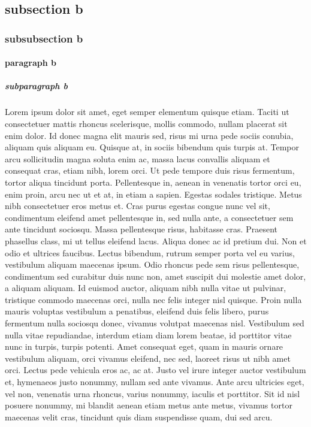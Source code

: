 \documentclass[12pt,a4paper,german]{article}
\begin{document}
\subsection{subsection b }
\subsubsection{subsubsection b}
\paragraph{paragraph b}
\subparagraph{subparagraph b}

Lorem ipsum dolor sit amet, eget semper elementum quisque etiam. Taciti ut consectetuer mattis rhoncus scelerisque, mollis commodo, nullam placerat sit enim dolor. Id donec magna elit mauris sed, risus mi urna pede sociis conubia, aliquam quis aliquam eu. Quisque at, in sociis bibendum quis turpis at. Tempor arcu sollicitudin magna soluta enim ac, massa lacus convallis aliquam et consequat cras, etiam nibh, lorem orci. Ut pede tempore duis risus fermentum, tortor aliqua tincidunt porta. Pellentesque in, aenean in venenatis tortor orci eu, enim proin, arcu nec ut et at, in etiam a sapien.
Egestas sodales tristique. Metus nibh consectetuer eros metus et. Cras purus egestas congue nunc vel sit, condimentum eleifend amet pellentesque in, sed nulla ante, a consectetuer sem ante tincidunt sociosqu. Massa pellentesque risus, habitasse cras. Praesent phasellus class, mi ut tellus eleifend lacus. Aliqua donec ac id pretium dui.
Non et odio et ultrices faucibus. Lectus bibendum, rutrum semper porta vel eu varius, vestibulum aliquam maecenas ipsum. Odio rhoncus pede sem risus pellentesque, condimentum sed curabitur duis nunc non, amet suscipit dui molestie amet dolor, a aliquam aliquam. Id euismod auctor, aliquam nibh nulla vitae ut pulvinar, tristique commodo maecenas orci, nulla nec felis integer nisl quisque. Proin nulla mauris voluptas vestibulum a penatibus, eleifend duis felis libero, purus fermentum nulla sociosqu donec, vivamus volutpat maecenas nisl. Vestibulum sed nulla vitae repudiandae, interdum etiam diam lorem beatae, id porttitor vitae nunc in turpis, turpis potenti. Amet consequat eget, quam in mauris ornare vestibulum aliquam, orci vivamus eleifend, nec sed, laoreet risus ut nibh amet orci. Lectus pede vehicula eros ac, ac at. Justo vel irure integer auctor vestibulum et, hymenaeos justo nonummy, nullam sed ante vivamus. Ante arcu ultricies eget, vel non, venenatis urna rhoncus, varius nonummy, iaculis et porttitor. Sit id nisl posuere nonummy, mi blandit aenean etiam metus ante metus, vivamus tortor maecenas velit cras, tincidunt quis diam suspendisse quam, dui sed arcu.
\end{document}
